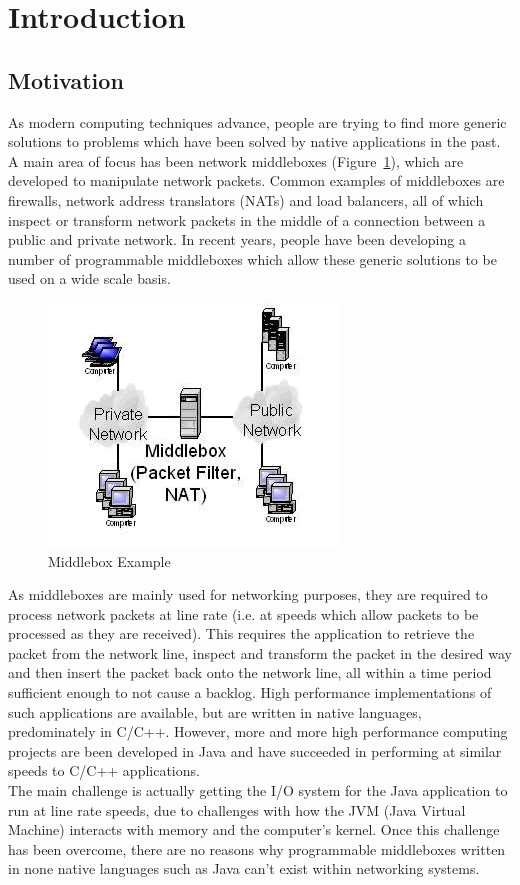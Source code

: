 \documentclass[interim_report.tex]{subfiles}
\begin{document}
\section{Introduction}
\subsection{Motivation}
As modern computing techniques advance, people are trying to find more generic solutions to problems which have been solved by native applications in the past. A main area of focus has been network middleboxes (Figure~\ref{fig:middlebox}), which are developed to manipulate network packets. Common examples of middleboxes are firewalls, network address translators (NATs) and load balancers, all of which inspect or transform network packets in the middle of a connection between a public and private network. In recent years, people have been developing a number of programmable middleboxes which allow these generic solutions to be used on a wide scale basis.

\begin{figure}[H]
	\centering
	\includegraphics[scale=0.75]{img/middleboxes.jpg}
	\caption{Middlebox Example \cite{middlebox}}
	\label{fig:middlebox}
\end{figure}

\noindent As middleboxes are mainly used for networking purposes, they are required to process network packets at line rate (i.e. at speeds which allow packets to be processed as they are received). This requires the application to retrieve the packet from the network line, inspect and transform the packet in the desired way and then insert the packet back onto the network line, all within a time period sufficient enough to not cause a backlog. High performance implementations of such applications are available, but are written in native languages, predominately in C/C++. However, more and more high performance computing projects are been developed in Java and have succeeded in performing at similar speeds to C/C++ applications. \\
\newline
The main challenge is actually getting the I/O system for the Java application to run at line rate speeds, due to challenges with how the JVM (Java Virtual Machine) interacts with memory and the computer's kernel. Once this challenge has been overcome, there are no reasons why programmable middleboxes written in none native languages such as Java can't exist within networking systems.
\end{document}
